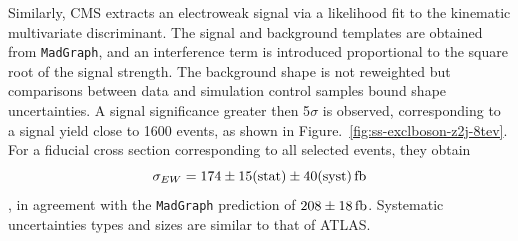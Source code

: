 Similarly, CMS extracts an electroweak signal via a likelihood fit to the kinematic multivariate discriminant.  The signal and background
templates are obtained from \texttt{MadGraph}, and an interference term is introduced proportional to the square root of the signal strength.
The background shape is not reweighted but comparisons between data and simulation control samples bound shape uncertainties.  A signal significance
greater then 5$\sigma$ is observed, corresponding to a signal yield close to 1600 events, as shown in Figure.~\ref{fig:ss-exclboson-z2j-8tev}.
For a fiducial cross section corresponding to all selected events, they obtain
$$\sigma_{EW} = 174 \pm 15 \rm{(stat)} \pm 40 \rm{(syst)} \rm{\,fb}$$,
in agreement with the \texttt{MadGraph} prediction of $208 \pm 18 \rm{\,fb}$.  Systematic uncertainties types and sizes are similar to that of ATLAS.
